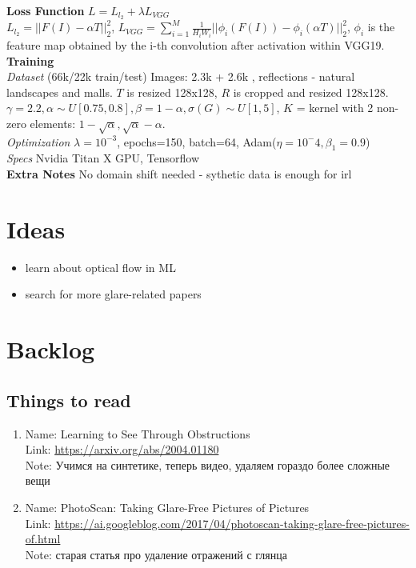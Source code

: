 \documentclass[a4paper, 12pt]{article}
\begin{document}
~\\\textbf{Loss Function} $L = L_{l_2} + \lambda L_{VGG}$\\
$L_{l_2} = || F(I) - \alpha T ||^2_2$, $L_{VGG} = \sum_{i=1}^M \frac{1}{H_i W_i}|| \phi_i(F(I)) - \phi_i(\alpha T) ||^2_2$, $\phi_i$ is the feature map obtained by the i-th convolution after activation within VGG19.
~\\\textbf{Training}\\
\textit{Dataset} (66k/22k train/test)
Images: 2.3k \cite{IndoorScenes} + 2.6k \cite{HelLooks}, reflections - natural landscapes and malls. $T$ is resized 128x128, $R$ is cropped and resized 128x128. $\gamma = 2.2, \alpha \sim U[0.75, 0.8], \beta = 1 - \alpha, \sigma(G) \sim U[1,5]$, $K$ = kernel with 2 non-zero elements: $1 - \sqrt{\alpha}, \sqrt{\alpha} - \alpha$.\\
\textit{Optimization} $\lambda=10^{-3}$, epochs=150, batch=64, Adam($\eta=10^-4, \beta_1=0.9$)\\
\textit{Specs} Nvidia Titan X GPU, Tensorflow
~\\\textbf{Extra Notes} No domain shift needed - sythetic data is enough for irl\\

\newpage
\section{Ideas}

\begin{itemize}
\item learn about optical flow in ML
\item search for more glare-related papers
\end{itemize}

\section{Backlog}

\subsection{Things to read}
\begin{enumerate}

\item
Name: Learning to See Through Obstructions \\
Link: \url{https://arxiv.org/abs/2004.01180} \\
Note: Учимся на синтетике, теперь видео, удаляем гораздо более сложные вещи

\item
Name: PhotoScan: Taking Glare-Free Pictures of Pictures \\
Link: \url{https://ai.googleblog.com/2017/04/photoscan-taking-glare-free-pictures-of.html} \\
Note: старая статья про удаление отражений с глянца

\end{enumerate}

\newpage


\end{document}
